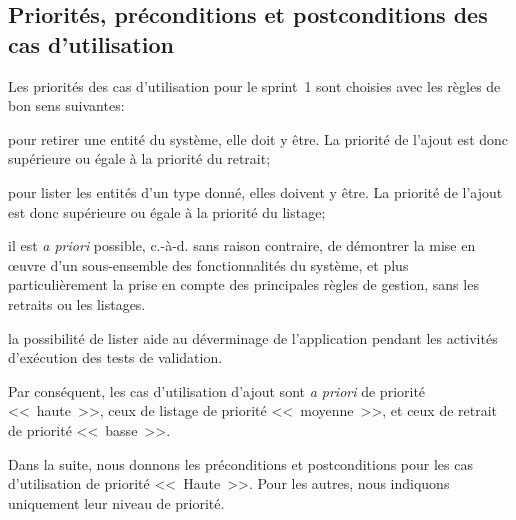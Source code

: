 \documentclass[11pt,article]{article}
\newcommand{\haute}{Haute}
\begin{document}
\newpage

\subsection{Priorités, préconditions et postconditions des cas d'utilisation}

Les priorités des cas d'utilisation pour le sprint~1 sont choisies
avec les règles de bon sens suivantes:
\begin{compactitem}
\item pour retirer une entité du système, elle doit y être. La
priorité de l'ajout est donc supérieure ou égale à la priorité du
retrait;
\item pour lister les entités d'un type donné, elles doivent y être. La
priorité de l'ajout est donc supérieure ou égale à la priorité du
listage;
\item il est \textit{a priori} possible, c.-à-d. sans raison
contraire, de démontrer la mise en œuvre d'un sous-ensemble des
fonctionnalités du système, et plus particulièrement la prise en
compte des principales règles de gestion, sans les retraits ou les
listages.
\item la possibilité de lister aide au déverminage de l'application
pendant les activités d'exécution des tests de validation.
\end{compactitem}
Par conséquent, les cas d'utilisation d'ajout sont \textit{a priori}
de priorité <<~haute~>>, ceux de listage de priorité <<~moyenne~>>, et
ceux de retrait de priorité <<~basse~>>.

\bigskip

Dans la suite, nous donnons les préconditions et postconditions pour
les cas d'utilisation de priorité <<~\haute~>>. Pour les autres, nous
indiquons uniquement leur niveau de priorité.

\bigskip
\end{document}
